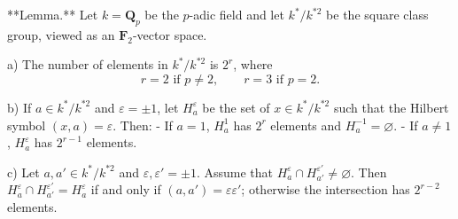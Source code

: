 **Lemma.** Let $k = \mathbf{Q}_p$ be the $p$-adic field and let $k^*/k^{*2}$ be the square class group, viewed as an $\mathbf{F}_2$-vector space.

a) The number of elements in $k^*/k^{*2}$ is $2^r$, where
$$r = 2 \text{ if } p \neq 2, \qquad r = 3 \text{ if } p = 2.$$

b) If $a \in k^*/k^{*2}$ and $\varepsilon = \pm 1$, let $H_a^\varepsilon$ be the set of $x \in k^*/k^{*2}$ such that the Hilbert symbol $(x, a) = \varepsilon$. Then:
- If $a = 1$, $H_a^1$ has $2^r$ elements and $H_a^{-1} = \varnothing$.
- If $a \neq 1$, $H_a^\varepsilon$ has $2^{r-1}$ elements.

c) Let $a, a' \in k^*/k^{*2}$ and $\varepsilon, \varepsilon' = \pm 1$. Assume that $H_a^\varepsilon \cap H_{a'}^{\varepsilon'} \neq \varnothing$. Then $H_a^\varepsilon \cap H_{a'}^{\varepsilon'} = H_a^\varepsilon$ if and only if $(a, a') = \varepsilon \varepsilon'$; otherwise the intersection has $2^{r-2}$ elements.
